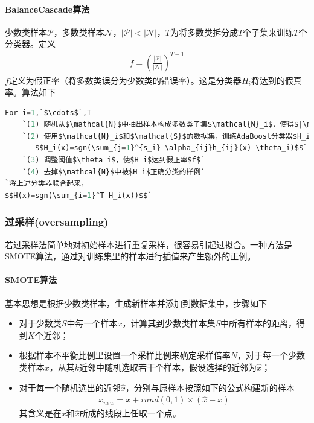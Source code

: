 \paragraph{BalanceCascade算法}
少数类样本$\mathcal{P}$，多数类样本$\mathcal{N}$，$|\mathcal{P}|<|\mathcal{N}|$，$T$为将多数类拆分成$T$个子集来训练$T$个分类器。定义
\begin{eqnarray}
f = \left( \frac{|\mathcal{P}|}{\mathcal{|N|}} \right)^{T-1}
\end{eqnarray}
$f$定义为假正率（将多数类误分为少数类的错误率）。这是分类器$H_i$将达到的假真率。算法如下
\begin{lstlisting}[language=python]
For i=1,`$\cdots$`,T
    `(1) 随机从$\mathcal{N}$中抽出样本构成多数类子集$\mathcal{N}_i$，使得$|\mathcal{N}_i|=|\mathcal{S}|$`
    `(2) 使用$\mathcal{N}_i$和$\mathcal{S}$的数据集，训练AdaBoost分类器$H_i$，其中$h_{ij}(x)$为弱分类器，训练$s_i$次，得到对应的权重$\alpha_{ij}$和阈值$\theta_i$，
       $$H_i(x)=sgn(\sum_{j=1}^{s_i} \alpha_{ij}h_{ij}(x)-\theta_i)$$`
    `(3) 调整阈值$\theta_i$，使$H_i$达到假正率$f$`
    `(4) 去掉$\mathcal{N}$中被$H_i$正确分类的样例`
`将上述分类器联合起来，
$$H(x)=sgn(\sum_{i=1}^T H_i(x))$$`
\end{lstlisting}

\subsubsection{过采样(oversampling)}
若过采样法简单地对初始样本进行重复采样，很容易引起过拟合。一种方法是SMOTE算法，通过对训练集里的样本进行插值来产生额外的正例。
\paragraph{SMOTE算法}基本思想是根据少数类样本，生成新样本并添加到数据集中，步骤如下
\begin{itemize}
\item[1] 对于少数类$S$中每一个样本$x$，计算其到少数类样本集$S$中所有样本的距离，得到$K$个近邻；
\item[2] 根据样本不平衡比例里设置一个采样比例来确定采样倍率$N$，对于每一个少数类样本$x$，从其$k$近邻中随机选取若干个样本，假设选择的近邻为$\hat{x}$；
\item[3] 对于每一个随机选出的近邻$\hat{x}$，分别与原样本按照如下的公式构建新的样本
\begin{eqnarray}
x_{new}=x + rand(0,1)\times(\hat{x}-x)
\end{eqnarray}
其含义是在$x$和$\hat{x}$所成的线段上任取一个点。
\end{itemize}


